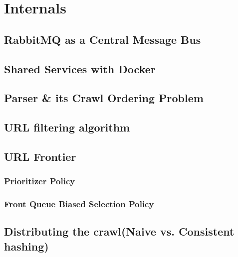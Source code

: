 \section{Internals}
\subsection{RabbitMQ as a Central Message Bus}
\subsection{Shared Services with Docker}
\subsection{Parser \& its Crawl Ordering Problem}
\subsection{URL filtering algorithm}
\subsection{URL Frontier}
\subsubsection{Prioritizer Policy}
\subsubsection{Front Queue Biased Selection Policy}
\subsection{Distributing the crawl(Naive vs. Consistent hashing)}

\pagebreak
